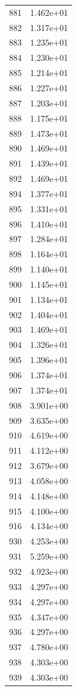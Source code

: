 \documentclass[12pt]{article}
\begin{document}
\begin{longtable}{@{}cc@{}}
881 & 1.462e+01 \\
882 & 1.317e+01 \\
883 & 1.235e+01 \\
884 & 1.230e+01 \\
885 & 1.214e+01 \\
886 & 1.227e+01 \\
887 & 1.203e+01 \\
888 & 1.175e+01 \\
889 & 1.473e+01 \\
890 & 1.469e+01 \\
891 & 1.439e+01 \\
892 & 1.469e+01 \\
894 & 1.377e+01 \\
895 & 1.331e+01 \\
896 & 1.410e+01 \\
897 & 1.284e+01 \\
898 & 1.164e+01 \\
899 & 1.140e+01 \\
900 & 1.145e+01 \\
901 & 1.134e+01 \\
902 & 1.404e+01 \\
903 & 1.469e+01 \\
904 & 1.326e+01 \\
905 & 1.396e+01 \\
906 & 1.374e+01 \\
907 & 1.374e+01 \\
908 & 3.901e+00 \\
909 & 3.635e+00 \\
910 & 4.619e+00 \\
911 & 4.112e+00 \\
912 & 3.679e+00 \\
913 & 4.058e+00 \\
914 & 4.148e+00 \\
915 & 4.100e+00 \\
916 & 4.134e+00 \\
930 & 4.253e+00 \\
931 & 5.259e+00 \\
932 & 4.923e+00 \\
933 & 4.297e+00 \\
934 & 4.297e+00 \\
935 & 4.347e+00 \\
936 & 4.297e+00 \\
937 & 4.780e+00 \\
938 & 4.303e+00 \\
939 & 4.303e+00 \\

\end{longtable}
\end{document}
